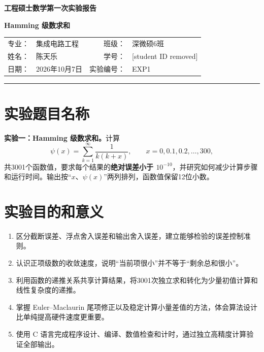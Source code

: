 \documentclass[UTF8,fontset=fandol,zihao=-4,a4paper]{ctexart}
\newcommand{\coursename}{工程硕士数学}
\newcommand{\studentname}{陈天乐}
\newcommand{\studentid}{[student ID removed]}
\newcommand{\classinfo}{深微硕6班}
\newcommand{\majorinfo}{集成电路工程}
\newcommand{\reportdate}{2026年10月7日}
\newcommand{\psif}{\psi}
\begin{document}
\begin{center}
 {\LARGE\bfseries \coursename\quad 第一次实验报告}\par
 \vspace{0.55em}
 {\Large\bfseries Hamming 级数求和}\par
 \vspace{1em}
 \begin{tabular}{rl@{\qquad}rl}
  专业：&\majorinfo & 班级：&\classinfo\\
  姓名：&\studentname & 学号：&\studentid\\
  日期：&\reportdate & 实验编号：&EXP1
 \end{tabular}
\end{center}
\vspace{0.5em}\hrule\vspace{0.6em}

\section{实验题目名称}
\textbf{实验一：Hamming 级数求和。}计算
\begin{equation}\label{eq:original}
 \psif(x)=\sum_{k=1}^{\infty}\frac{1}{k(k+x)},
 \qquad x=0,0.1,0.2,\ldots,300,
\end{equation}
共3001个函数值，要求每个结果的\textbf{绝对误差小于 $10^{-10}$}，并研究如何减少计算步骤和运行时间。输出按“$x$、$\psif(x)$”两列排列，函数值保留12位小数。


\section{实验目的和意义}
\begin{enumerate}
 \item 区分截断误差、浮点舍入误差和输出舍入误差，建立能够检验的误差控制准则。
 \item 认识正项级数的收敛速度，说明“当前项很小”并不等于“剩余总和很小”。
 \item 利用函数的递推关系共享计算结果，将3001次独立求和转化为少量初值计算和线性复杂度的递推。
 \item 掌握 Euler--Maclaurin 尾项修正以及稳定计算小量差值的方法，体会算法设计比单纯提高硬件速度更重要。
 \item 使用 C 语言完成程序设计、编译、数值检查和计时，通过独立高精度计算验证全部输出。
\end{enumerate}
\end{document}
